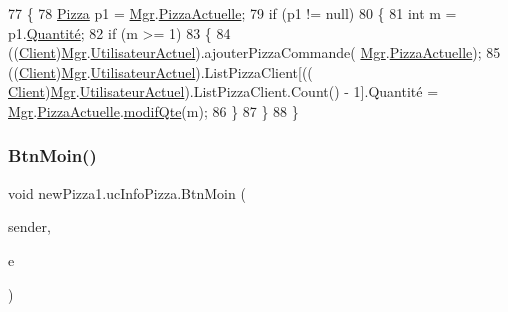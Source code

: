\begin{DoxyCode}
77         \{
78             \hyperlink{classModele_1_1Pizza}{Pizza} p1 = \hyperlink{classnewPizza1_1_1ucInfoPizza_ade399f2ed146dd3b5b0a4784a8670652}{Mgr}.\hyperlink{classModele_1_1Manager_a7e69844aeeebbc80144850efc0d2b94c}{PizzaActuelle};
79             \textcolor{keywordflow}{if} (p1 != null)
80             \{
81                 \textcolor{keywordtype}{int} m = p1.\hyperlink{classModele_1_1Pizza_ae755ca79feb6f9a522aa18544c3f1310}{Quantité};
82                 \textcolor{keywordflow}{if} (m >= 1)
83                 \{
84                     ((\hyperlink{classModele_1_1Client}{Client})\hyperlink{classnewPizza1_1_1ucInfoPizza_ade399f2ed146dd3b5b0a4784a8670652}{Mgr}.\hyperlink{classModele_1_1Manager_aa00c4632bd15b247d6b6793a6797dc82}{UtilisateurActuel}).ajouterPizzaCommande(
      \hyperlink{classnewPizza1_1_1ucInfoPizza_ade399f2ed146dd3b5b0a4784a8670652}{Mgr}.\hyperlink{classModele_1_1Manager_a7e69844aeeebbc80144850efc0d2b94c}{PizzaActuelle});
85                     ((\hyperlink{classModele_1_1Client}{Client})\hyperlink{classnewPizza1_1_1ucInfoPizza_ade399f2ed146dd3b5b0a4784a8670652}{Mgr}.\hyperlink{classModele_1_1Manager_aa00c4632bd15b247d6b6793a6797dc82}{UtilisateurActuel}).ListPizzaClient[((
      \hyperlink{classModele_1_1Client}{Client})\hyperlink{classnewPizza1_1_1ucInfoPizza_ade399f2ed146dd3b5b0a4784a8670652}{Mgr}.\hyperlink{classModele_1_1Manager_aa00c4632bd15b247d6b6793a6797dc82}{UtilisateurActuel}).ListPizzaClient.Count() - 1].Quantité = 
      \hyperlink{classnewPizza1_1_1ucInfoPizza_ade399f2ed146dd3b5b0a4784a8670652}{Mgr}.\hyperlink{classModele_1_1Manager_a7e69844aeeebbc80144850efc0d2b94c}{PizzaActuelle}.\hyperlink{classModele_1_1Pizza_a86b98da27e7ada45355e8576792d75c5}{modifQte}(m);
86                 \}
87             \}
88         \}
\end{DoxyCode}
\mbox{\label{classnewPizza1_1_1ucInfoPizza_a6c34810b0c856bfb31a50fe26bc83368}} 
\subsubsection{\texorpdfstring{Btn\+Moin()}{BtnMoin()}}
{\footnotesize\ttfamily void new\+Pizza1.\+uc\+Info\+Pizza.\+Btn\+Moin (\begin{DoxyParamCaption}\item[{object}]{sender,  }\item[{Routed\+Event\+Args}]{e }\end{DoxyParamCaption})\hspace{0.3cm}{\ttfamily [inline]}}



